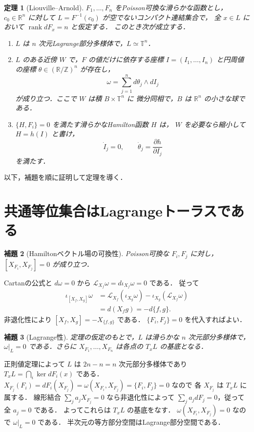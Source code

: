\documentclass[a5paper,10pt,onecolumn]{jsarticle}
\makeatletter
\theoremstyle{mathnotetheorem}
\newtheorem{theorem}{定理}[section]
\newtheorem{lemma}[theorem]{補題}
\renewcommand{\proofname}{証明}
\renewenvironment{proof}[1][\proofname]{%
  \par\pushQED{\qed}\normalfont\topsep4\p@\@plus2\p@\relax
  \trivlist\item[\hskip\labelsep\bfseries #1]\ignorespaces
}{\popQED\endtrivlist\@endpefalse}
\makeatother
\begin{document}
\begin{theorem}[Liouville--Arnold]
$F_1,\ldots,F_n$ をPoisson可換な滑らかな函数とし，
$c_0\in\mathbb R^n$ に対して
$L=F^{-1}(c_0)$ が空でないコンパクト連結集合で，
全 $x\in L$ において $\operatorname{rank}dF_x=n$ と仮定する．
このとき次が成立する．
\begin{enumerate}
 \item $L$ は $n$ 次元Lagrange部分多様体で，$L\simeq\mathbb T^n$．
 \item $L$ のある近傍 $W$ で，$F$ の値だけに依存する座標
       $I=(I_1,\ldots,I_n)$ と円周値の座標
       $\theta\in(\mathbb R/\mathbb Z)^n$ が存在し，
       \[
       \omega=\sum_{j=1}^n d\theta_j\wedge dI_j
       \]
       が成り立つ．ここで $W$ は積 $B\times\mathbb T^n$ に
       微分同相で，$B$ は $\mathbb R^n$ の小さな球である．
 \item $\{H,F_i\}=0$ を満たす滑らかなHamilton函数 $H$ は，
       $W$ を必要なら縮小して $H=h(I)$ と書け，
       \[
          \dot I_j=0,\qquad
          \dot\theta_j=\frac{\partial h}{\partial I_j}
       \]
       を満たす．
\end{enumerate}
\end{theorem}

以下，補題を順に証明して定理を導く．

\section{共通等位集合はLagrangeトーラスである}
\begin{lemma}[Hamiltonベクトル場の可換性]
Poisson可換な $F_i,F_j$ に対し，
$[X_{F_i},X_{F_j}]=0$ が成り立つ．
\end{lemma}
\begin{proof}
Cartanの公式と $d\omega=0$ から
$\mathcal L_{X_f}\omega=d\iota_{X_f}\omega=0$ である．
従って
\[
 \begin{aligned}
 \iota_{[X_f,X_g]}\omega
 &=\mathcal L_{X_f}(\iota_{X_g}\omega)
   -\iota_{X_g}(\mathcal L_{X_f}\omega)\\
 &=d(X_fg)=-d\{f,g\}.
 \end{aligned}
\]
非退化性により $[X_f,X_g]=-X_{\{f,g\}}$ である．
$\{F_i,F_j\}=0$ を代入すればよい．
\end{proof}

\begin{lemma}[Lagrange性]
定理の仮定のもとで，$L$ は滑らかな $n$ 次元部分多様体で，
$\omega|_L=0$ である．さらに
$X_{F_1},\ldots,X_{F_n}$ は各点の $T_xL$ の基底となる．
\end{lemma}
\begin{proof}
正則値定理によって $L$ は $2n-n=n$ 次元部分多様体であり
$T_xL=\bigcap_i\ker dF_i(x)$ である．
$X_{F_j}(F_i)=dF_i(X_{F_j})
=\omega(X_{F_i},X_{F_j})=\{F_i,F_j\}=0$ なので
各 $X_{F_j}$ は $T_xL$ に属する．
線形結合 $\sum_ja_jX_{F_j}=0$ なら非退化性によって
$\sum_ja_jdF_j=0$，従って全 $a_j=0$ である．
よってこれらは $T_xL$ の基底をなす．
$\omega(X_{F_i},X_{F_j})=0$ なので $\omega|_L=0$ である．
半次元の等方部分空間はLagrange部分空間である．
\end{proof}
\end{document}
